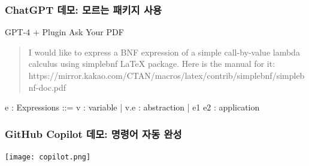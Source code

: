 \begin{frame}[c]
  \frametitle{ChatGPT 데모: 모르는 패키지 사용}

  GPT-4 + Plugin Ask Your PDF

  \begin{quotation}
    I would like to express a BNF expression of a simple call-by-value lambda calculus using simplebnf LaTeX package. Here is the manual for it: https://mirror.kakao.com/CTAN/macros/latex/contrib/simplebnf/simplebnf-doc.pdf
  \end{quotation}

  \begin{bnfgrammar}
    e : Expressions ::=
      v : variable
    | \lambda v.e : abstraction
    | e1 e2 : application
  \end{bnfgrammar}
\end{frame}


\begin{frame}[c,fragile]
  \frametitle{GitHub Copilot 데모: 명령어 자동 완성}

  \begin{texcode}
\begin{center}
  \texttt{[image: copilot.png]}
\end{center}
  \end{texcode}

\end{frame}

